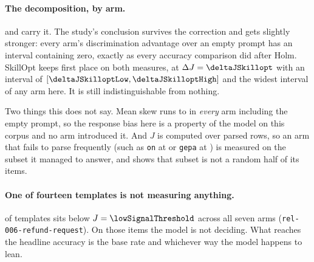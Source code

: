 
\paragraph{The decomposition, by arm.}  and
 carry it. The study's conclusion survives the correction
and gets slightly stronger: every arm's discrimination advantage over an
empty prompt has an interval containing zero, exactly as every accuracy
comparison did after Holm. SkillOpt keeps first place on both measures, at
$\Delta J = \NUM{\deltaJSkillopt}$ with an interval of
$[\NUM{\deltaJSkilloptLow}, \NUM{\deltaJSkilloptHigh}]$ and the widest
interval of any arm here. It is still indistinguishable from nothing.

Two things this does not say. Mean skew runs \NUM{\meanSkewSkillopt} to
\NUM{\meanSkewOn} in \emph{every} arm including the empty prompt, so the
response bias here is a property of the model on this corpus and no arm
introduced it. And $J$ is computed over parsed rows, so an arm that fails to
parse frequently (such as \texttt{on} at \NUM{\parseRateOn} or \texttt{gepa} at
\NUM{\parseRateGepa}) is measured on the subset it managed to answer, and
 shows that subset is not a random half of its items.

\paragraph{One of fourteen templates is not measuring anything.}

\begin{table}[htbp]
\centering
\templateTable
\caption{Informedness per template, across all seven arms. Templates marked $\dagger$ sit
below $J = \NUM{\lowSignalThreshold}$ in all arms.}
\label{tab:templates}
\end{table}

\NUM{\lowSignalTemplates} of \NUM{\studyTemplates} templates sits below
$J = \NUM{\lowSignalThreshold}$ across all seven arms (\texttt{rel-006-refund-request}).
On those items the model is not deciding. What reaches the headline accuracy is
the base rate and whichever way the model happens to lean.

